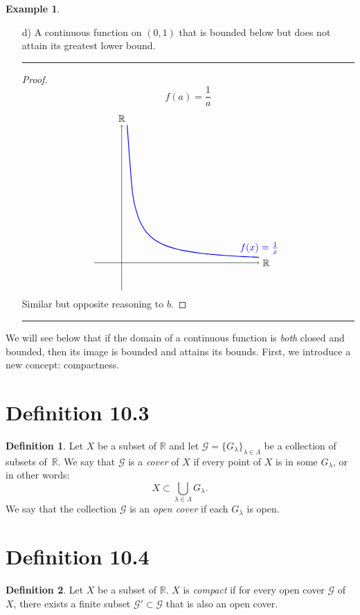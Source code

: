\documentclass[openany, amssymb, psamsfonts]{amsart}
\newcommand{\bbR}{\mathbb{R}}
\theoremstyle{definition}
\newtheorem{defn}{Definition}[section]
\newtheorem{exmp}{Example}[section]
\numberwithin{equation}{section}
\begin{document}
\begin{exmp}
\begin{enumerate}
\begin{proof}
\[\begin{tikzpicture}
\end{tikzpicture}\]
For any $f(x) \in \bbR$, because $A$ is infinite, then there exists some $y\in A$ such that $x<y$ and therefore $f(y)<f(x)$.
\end{proof} \vspace{4pt}     \hrule   \vspace{4pt}
\item[d)]  A continuous function on $(0,1)$ that is bounded below but does not attain its greatest lower bound. 
 \vspace{4pt}     \hrule   \vspace{4pt}\begin{proof}
 $$f(a) = \frac{1}{a}$$
 \[\begin{tikzpicture}
    \draw[->] (-1,0) -- (5,0) node[right] {$\bbR$};
    \draw[->] (0,-1) -- (0,5) node[above] {$\bbR$};
    \draw[domain=0.2:5, smooth, thick, blue] plot (\x, {1/\x}) node[above] {$f(x) = \frac{1}{x}$};
\end{tikzpicture}\]
Similar but opposite reasoning to $b$.
\end{proof} \vspace{4pt}     \hrule   \vspace{4pt}
\end{enumerate}
\end{exmp}


We will see below that if the domain of a continuous function is {\em both} closed and bounded, then its image is bounded and attains its bounds. First, we introduce a new concept:
 compactness. 

\section*{Definition 10.3}
\begin{defn} 
\label{10.3}
Let $X$ be a subset of $\bbR$ and let $\mathcal{G} = \{ G_{\lambda} \}_{\lambda \in \Lambda}$ be a collection of subsets of~$\bbR$.  We say that $\mathcal{G}$ is a \emph{cover} of $X$ if every point of $X$ is in some $G_{\lambda}$, or in other words:
\[
X \subset \bigcup_{\lambda \in \Lambda} G_{\lambda}.
\]
We say that the collection $\mathcal{G}$ is an \emph{open cover} if each $G_{\lambda}$ is open.
\end{defn}

\section*{Definition 10.4}
\begin{defn} 
\label{10.4}
Let $X$ be a subset of $\bbR$.  $X$ is \emph{compact} if for every open cover $\mathcal{G}$ of $X$, there exists a finite subset $\mathcal{G}' \subset \mathcal{G}$ that is also an open cover.
\end{defn}
\end{document}
